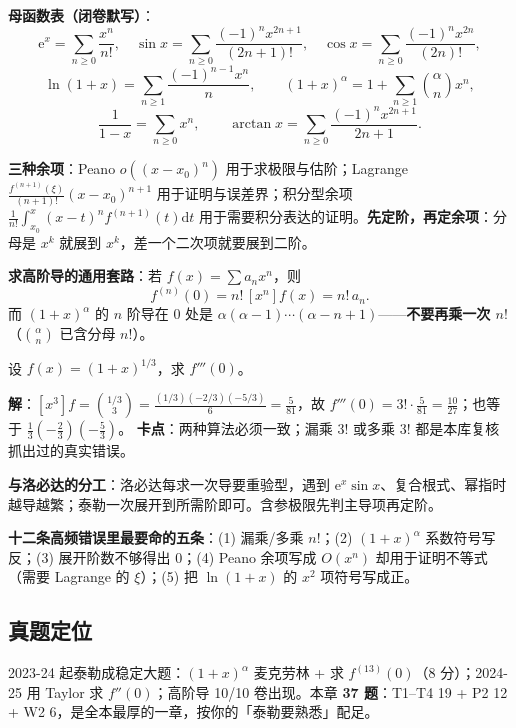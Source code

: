 \documentclass[11pt,a4paper]{ctexart}
\newcommand{\ee}{\mathrm{e}}
\newcommand{\D}{\mathrm{d}}
\begin{document}
\textbf{母函数表（闭卷默写）}：
\[
\ee^{x}=\sum_{n\ge0}\frac{x^{n}}{n!},\quad
\sin x=\sum_{n\ge0}\frac{(-1)^{n}x^{2n+1}}{(2n+1)!},\quad
\cos x=\sum_{n\ge0}\frac{(-1)^{n}x^{2n}}{(2n)!},
\]
\[
\ln(1+x)=\sum_{n\ge1}\frac{(-1)^{n-1}x^{n}}{n},\qquad
(1+x)^{\alpha}=1+\sum_{n\ge1}\binom{\alpha}{n}x^{n},
\]
\[
\frac1{1-x}=\sum_{n\ge0}x^{n},\qquad
\arctan x=\sum_{n\ge0}\frac{(-1)^{n}x^{2n+1}}{2n+1}.
\]

\textbf{三种余项}：Peano $o((x-x_0)^n)$ 用于求极限与估阶；Lagrange $\frac{f^{(n+1)}(\xi)}{(n+1)!}(x-x_0)^{n+1}$ 用于证明与误差界；积分型余项 $\frac1{n!}\int_{x_0}^{x}(x-t)^{n}f^{(n+1)}(t)\D t$ 用于需要积分表达的证明。\textbf{先定阶，再定余项}：分母是 $x^k$ 就展到 $x^k$，差一个二次项就要展到二阶。

\textbf{求高阶导的通用套路}：若 $f(x)=\sum a_n x^{n}$，则
\[
f^{(n)}(0)=n!\,[x^{n}]f(x)=n!\,a_n .
\]
而 $(1+x)^{\alpha}$ 的 $n$ 阶导在 $0$ 处是 $\alpha(\alpha-1)\cdots(\alpha-n+1)$——\textbf{不要再乘一次 $n!$}（$\binom{\alpha}{n}$ 已含分母 $n!$）。

\begin{keypoint}
设 $f(x)=(1+x)^{1/3}$，求 $f'''(0)$。

\noindent\textbf{解}：$[x^{3}]f=\binom{1/3}{3}=\frac{(1/3)(-2/3)(-5/3)}{6}=\frac{5}{81}$，故 $f'''(0)=3!\cdot\frac{5}{81}=\boxed{\frac{10}{27}}$；也等于 $\frac13(-\frac23)(-\frac53)$。
\textbf{卡点}：两种算法必须一致；漏乘 $3!$ 或多乘 $3!$ 都是本库复核抓出过的真实错误。
\end{keypoint}

\noindent\textbf{与洛必达的分工}：洛必达每求一次导要重验型，遇到 $\ee^{x}\sin x$、复合根式、幂指时越导越繁；泰勒一次展开到所需阶即可。含参极限先判主导项再定阶。

\noindent\textbf{十二条高频错误里最要命的五条}：(1) 漏乘/多乘 $n!$；(2) $(1+x)^\alpha$ 系数符号写反；(3) 展开阶数不够得出 $0$；(4) Peano 余项写成 $O(x^{n})$ 却用于证明不等式（需要 Lagrange 的 $\xi$）；(5) 把 $\ln(1+x)$ 的 $x^2$ 项符号写成正。

\subsection{真题定位}
2023-24 起泰勒成稳定大题：$(1+x)^\alpha$ 麦克劳林 + 求 $f^{(13)}(0)$（8 分）；2024-25 用 Taylor 求 $f''(0)$；高阶导 10/10 卷出现。本章 \textbf{37 题}：T1--T4 19 + P2 12 + W2 6，是全本最厚的一章，按你的「泰勒要熟悉」配足。
\end{document}
